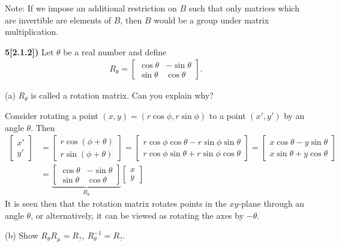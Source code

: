 \documentclass[12pt,a4paper]{article}
\newcommand{\prob}[2]{\textbf{#1)} #2}
\begin{document}
Note: If we impose an additional restriction on $B$ such that only matrices which are invertible are elements of $B$, then $B$ would be a group under matrix multiplication.

\prob{5[2.1.2]}{Let $\theta$ be a real number and define 
\begin{align*}
R_{\theta} = \begin{bmatrix}
\cos{\theta} & -\sin{\theta} \\
\sin{\theta} & \cos{\theta}
\end{bmatrix}.
\end{align*}
}
(a) $R_{\theta}$ is called a rotation matrix. Can you explain why?

Consider rotating a point $(x,y) = (r\cos{\phi},r\sin{\phi})$ to a point $(x',y')$ by an angle $\theta$. Then
\begin{align*}
\begin{bmatrix}
x' \\ y'
\end{bmatrix}
&=
\begin{bmatrix}
r\cos{(\phi + \theta)} \\ r\sin{(\phi + \theta)}
\end{bmatrix}
= \begin{bmatrix}
r\cos{\phi}\cos{\theta} - r\sin{\phi}\sin{\theta} \\
r\cos{\phi}\sin{\theta} + r\sin{\phi}\cos{\theta}
\end{bmatrix}
=
\begin{bmatrix}
x\cos{\theta} - y\sin{\theta} \\
x\sin{\theta} + y\cos{\theta}
\end{bmatrix}
\\
&=
\underbrace{\begin{bmatrix}
\cos{\theta} & -\sin{\theta} \\
\sin{\theta} & \cos{\theta}
\end{bmatrix}}_{R_{\theta}}
\begin{bmatrix}
x \\ y
\end{bmatrix}
\end{align*}
It is seen then that the rotation matrix rotates points in the $xy$-plane through an angle $\theta$, or alternatively, it can be viewed as rotating the axes by $-\theta$.

(b) Show $R_{\theta}R_{\mu} = R_{?},~R_{\theta}^{-1} = R_{?}$.
\end{document}

